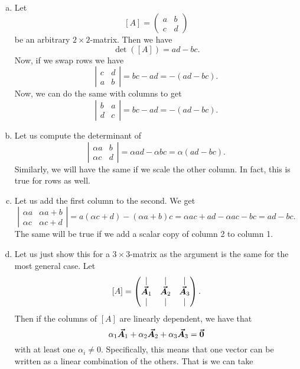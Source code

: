 \documentclass[12pt]{article} %
\begin{document}
\begin{solution}~
\begin{enumerate}[(a)]
    \item Let
    \[
    [A]=\begin{pmatrix} a & b \\ c & d \end{pmatrix}
    \]
    be an arbitrary $2\times 2$-matrix.  Then we have
    \[
    \det([A])=ad-bc.
    \]
    Now, if we swap rows we have
    \[
    \left| \begin{matrix} c & d \\ a & b \end{matrix} \right| = bc-ad = -(ad-bc).
    \]
    Now, we can do the same with columns to get
    \[
    \left| \begin{matrix} b & a \\ d & c \end{matrix} \right| = bc-ad = -(ad-bc).
    \]
    \item Let us compute the determinant of
    \[
    \left| \begin{matrix} \alpha a & b \\ \alpha c & d \end{matrix} \right| = \alpha ad - \alpha bc = \alpha(ad-bc).
    \]
    Similarly, we will have the same if we scale the other column. In fact, this is true for rows as well.
    \item Let us add the first column to the second. We get
    \[
     \left| \begin{matrix} \alpha a & \alpha a+b \\ \alpha c & \alpha c+d \end{matrix} \right| = a(\alpha c+d)-(\alpha a+b)c = \alpha ac+ad-\alpha ac-bc = ad-bc.
    \]
    The same will be true if we add a scalar copy of column 2 to column 1.
    \item Let us just show this for a $3\times 3$-matrix as the argument is the same for the most general case.  Let
\[
[A] = \begin{pmatrix} \vert & \vert & \vert \\ \boldsymbol{\vec{A}}_1 & \boldsymbol{\vec{A}}_2 & \boldsymbol{\vec{A}}_3 \\ \vert & \vert & \vert \end{pmatrix}.
\]
Then if the columns of $[A]$ are linearly dependent, we have that
\[
\alpha_1 \boldsymbol{\vec{A}}_1 + \alpha_2 \boldsymbol{\vec{A}}_2 + \alpha_3 \boldsymbol{\vec{A}}_3 = \boldsymbol{\vec{0}}
\]
with at least one $\alpha_i\neq 0$.  Specifically, this means that one vector can be written as a linear combination of the others. That is we can take

\end{enumerate}
\end{solution}
\end{document}
